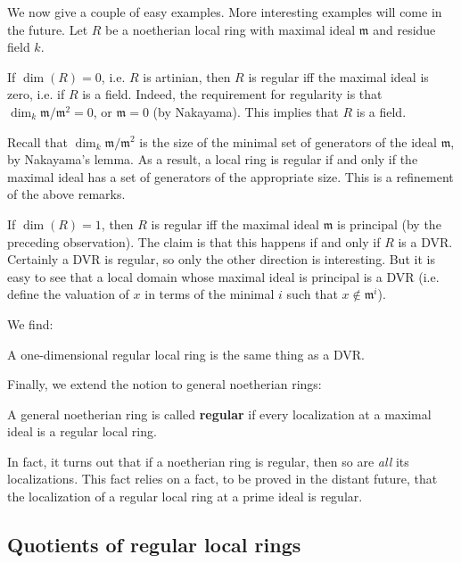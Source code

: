 We now give a couple of easy examples. More interesting examples will come in
the future.
Let $R$ be a noetherian local ring with maximal ideal $\mathfrak{m}$ and
residue field $k$.

\begin{example} 
If $\dim(R)=0$, i.e. $R$ is artinian, then $R$ is regular iff the maximal ideal
is zero, i.e. if $R$ is a field.
Indeed, the requirement for regularity is that $\dim_k \mathfrak{m}/\mathfrak{m}^2 = 0$, or
$\mathfrak{m} = 0$ (by Nakayama). This implies that $R$ is a field.
\end{example} 

Recall that $\dim_k \mathfrak{m}/\mathfrak{m}^2$ is the size of the minimal set
of generators of the ideal $\mathfrak{m}$, by Nakayama's lemma. As a result, a
local ring is regular if and only if the maximal ideal has a set of generators
of the appropriate size. This is a refinement of the above remarks.

\begin{example} 
If $\dim(R) =1$, then $R$ is regular iff the maximal ideal $\mathfrak{m}$ is
principal (by the preceding observation). 
The claim is that this happens if and only if $R$ is  a DVR. Certainly a DVR is
regular, so only the other direction is interesting. 
But it is easy to see that a local domain whose maximal ideal is principal is a
DVR (i.e. define the valuation of $x$ in terms of the minimal $i$ such that $x
\notin \mathfrak{m}^i$).
\end{example} 
We find:
\begin{proposition} 
A one-dimensional regular local ring is the same thing as a DVR.
\end{proposition} 


Finally, we extend the notion to general noetherian rings:
\begin{definition} 
A general noetherian ring is called \textbf{regular} if every localization at a
maximal ideal is a regular local ring.
\end{definition} 
In fact, it turns out that if a noetherian ring is regular, then so are
\emph{all} its localizations. This fact relies on a fact, to be proved in the
distant future, that the localization of a regular local ring at a prime ideal is regular.
\subsection{Quotients of regular local rings}

